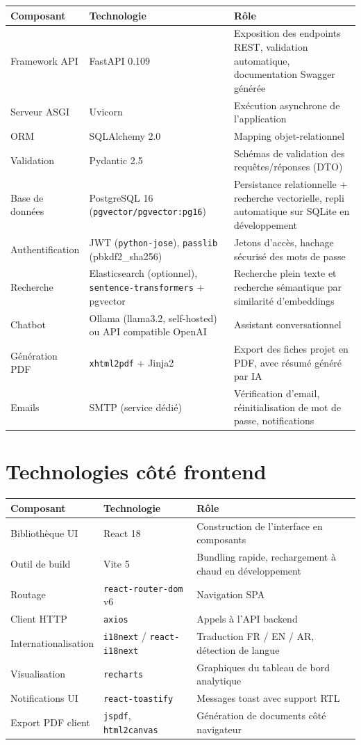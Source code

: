 \documentclass[11pt,a4paper]{report}
\begin{document}
\begin{longtable}{@{}p{3cm}p{4.5cm}p{7cm}@{}}
\toprule
\textbf{Composant} & \textbf{Technologie} & \textbf{Rôle} \\
\midrule
\endhead
Framework API & FastAPI 0.109 & Exposition des endpoints REST, validation automatique, documentation Swagger générée \\
Serveur ASGI & Uvicorn & Exécution asynchrone de l'application \\
ORM & SQLAlchemy 2.0 & Mapping objet-relationnel \\
Validation & Pydantic 2.5 & Schémas de validation des requêtes/réponses (DTO) \\
Base de données & PostgreSQL 16 (\texttt{pgvector/pgvector:pg16}) & Persistance relationnelle + recherche vectorielle, repli automatique sur SQLite en développement \\
Authentification & JWT (\texttt{python-jose}), \texttt{passlib} (pbkdf2\_sha256) & Jetons d'accès, hachage sécurisé des mots de passe \\
Recherche & Elasticsearch (optionnel), \texttt{sentence-transformers} + pgvector & Recherche plein texte et recherche sémantique par similarité d'embeddings \\
Chatbot & Ollama (llama3.2, self-hosted) ou API compatible OpenAI & Assistant conversationnel \\
Génération PDF & \texttt{xhtml2pdf} + Jinja2 & Export des fiches projet en PDF, avec résumé généré par IA \\
Emails & SMTP (service dédié) & Vérification d'email, réinitialisation de mot de passe, notifications \\
\bottomrule
\end{longtable}

\section{Technologies côté frontend}

\begin{longtable}{@{}p{3.5cm}p{4cm}p{7cm}@{}}
\toprule
\textbf{Composant} & \textbf{Technologie} & \textbf{Rôle} \\
\midrule
\endhead
Bibliothèque UI & React 18 & Construction de l'interface en composants \\
Outil de build & Vite 5 & Bundling rapide, rechargement à chaud en développement \\
Routage & \texttt{react-router-dom} v6 & Navigation SPA \\
Client HTTP & \texttt{axios} & Appels à l'API backend \\
Internationalisation & \texttt{i18next} / \texttt{react-i18next} & Traduction FR / EN / AR, détection de langue \\
Visualisation & \texttt{recharts} & Graphiques du tableau de bord analytique \\
Notifications UI & \texttt{react-toastify} & Messages toast avec support RTL \\
Export PDF client & \texttt{jspdf}, \texttt{html2canvas} & Génération de documents côté navigateur \\
\bottomrule
\end{longtable}
\end{document}
